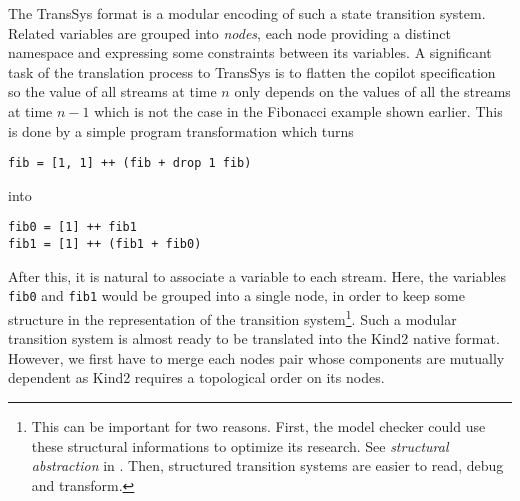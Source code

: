 The {TransSys} format is a modular encoding of such a state transition system. Related variables are grouped into \textit{nodes}, each node providing a distinct namespace and expressing some constraints between its variables. A significant task of the translation process to TransSys is to flatten the copilot specification so the value of all streams at time $n$ only depends on the values of all the streams at time $n - 1$ which is not the case in the Fibonacci example shown earlier. This is done by a simple program transformation which turns
\begin{lstlisting}
fib = [1, 1] ++ (fib + drop 1 fib)
\end{lstlisting}
into
\begin{lstlisting}
fib0 = [1] ++ fib1
fib1 = [1] ++ (fib1 + fib0)
\end{lstlisting}

After this, it is natural to associate a variable to each stream. Here, the variables \texttt{fib0} and \texttt{fib1} would be grouped into a single node, in order to keep some structure in the representation of the transition system\footnote{This can be important for two reasons. First, the model checker could use these structural informations to optimize its research. See \emph{structural abstraction} in \cite{HagenPhD}. Then, structured transition systems are easier to read, debug and transform. }. Such a modular transition system is almost ready to be translated into the Kind2 native format. However, we first have to merge each nodes pair whose components are mutually dependent as Kind2 requires a topological order on its nodes.




